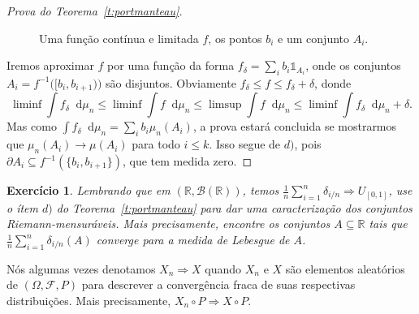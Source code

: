 \documentclass[reqno]{article}
\newcommand*\1{\mathds{1}}
\newtheorem{exercise}[example]{Exercício}
\renewcommand*\d{\mathop{}\!\mathrm{d}}
\begin{document}
\begin{proof}[Prova do Teorema~\ref{t:portmanteau}]
  \begin{figure}[!h]
    \centering
    \caption{Uma função contínua e limitada $f$, os pontos $b_i$ e um conjunto $A_i$.}
  \end{figure}

  Iremos aproximar $f$ por uma função da forma $f_\delta = \sum_{i} b_i \1_{A_i}$, onde os conjuntos $A_i = f^{-1}\big( [b_i, b_{i+1}) \big)$ são disjuntos.
  Obviamente $f_\delta \leq f \leq f_\delta + \delta$, donde
  \begin{equation*}
    \liminf \int f_\delta \d \mu_n \leq \liminf \int f \d \mu_n \leq \limsup \int f \d \mu_n \leq \liminf \int f_\delta \d \mu_n + \delta.
  \end{equation*}
  Mas como $\int f_\delta \d \mu_n = \sum_i b_i \mu_n (A_i)$, a prova estará concluida se mostrarmos que $\mu_n (A_i) \to \mu(A_i)$ para todo $i \leq k$.
  Isso segue de $d)$, pois $\partial A_i \subseteq f^{-1}(\{b_i, b_{i+1}\})$, que tem medida zero.
\end{proof}

\begin{exercise}
  Lembrando que em $(\mathbb{R}, \mathcal{B}(\mathbb{R}))$, temos $\tfrac{1}{n} \sum_{i=1}^n \delta_{i/n} \Rightarrow U_{[0,1]}$, use o ítem $d)$ do Teorema~\ref{t:portmanteau} para dar uma caracterização dos conjuntos Riemann-mensuráveis.
  Mais precisamente, encontre os conjuntos $A \subseteq \mathbb{R}$ tais que $\tfrac{1}{n} \sum_{i=1}^n \delta_{i/n}(A)$ converge para a medida de Lebesgue de $A$.
\end{exercise}

\newpage

Nós algumas vezes denotamos $X_n \Rightarrow X$ quando $X_n$ e $X$ são elementos aleatórios de $(\Omega, \mathcal{F}, P)$ para descrever a convergência fraca de suas respectivas distribuições.
Mais precisamente, $X_n \circ P \Rightarrow X \circ P$.
\end{document}
